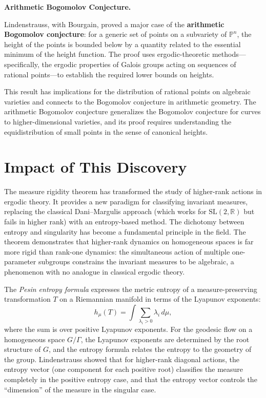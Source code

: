 \textbf{Arithmetic Bogomolov Conjecture.}

Lindenstrauss, with Bourgain, proved a major case of the \textbf{arithmetic Bogomolov conjecture}: for a generic set of points on a subvariety of $\mathbb{P}^n$, the height of the points is bounded below by a quantity related to the essential minimum of the height function. The proof uses ergodic-theoretic methods---specifically, the ergodic properties of Galois groups acting on sequences of rational points---to establish the required lower bounds on heights.

This result has implications for the distribution of rational points on algebraic varieties and connects to the Bogomolov conjecture in arithmetic geometry. The arithmetic Bogomolov conjecture generalizes the Bogomolov conjecture for curves to higher-dimensional varieties, and its proof requires understanding the equidistribution of small points in the sense of canonical heights.

\section{Impact of This Discovery}\label{ch2010elonlindenstrauss:impact-of-this-discovery}

The measure rigidity theorem has transformed the study of higher-rank actions in ergodic theory. It provides a new paradigm for classifying invariant measures, replacing the classical Dani--Margulis approach (which works for $\text{SL}(2,\mathbb{R})$ but fails in higher rank) with an entropy-based method. The dichotomy between entropy and singularity has become a fundamental principle in the field. The theorem demonstrates that higher-rank dynamics on homogeneous spaces is far more rigid than rank-one dynamics: the simultaneous action of multiple one-parameter subgroups constrains the invariant measures to be algebraic, a phenomenon with no analogue in classical ergodic theory.

The \emph{Pesin entropy formula} expresses the metric entropy of a measure-preserving transformation $T$ on a Riemannian manifold in terms of the Lyapunov exponents:
\[
h_\mu(T) = \int \sum_{\lambda_i > 0} \lambda_i \, d\mu,
\]
where the sum is over positive Lyapunov exponents. For the geodesic flow on a homogeneous space $G/\Gamma$, the Lyapunov exponents are determined by the root structure of $G$, and the entropy formula relates the entropy to the geometry of the group. Lindenstrauss showed that for higher-rank diagonal actions, the entropy vector (one component for each positive root) classifies the measure completely in the positive entropy case, and that the entropy vector controls the ``dimension'' of the measure in the singular case.

